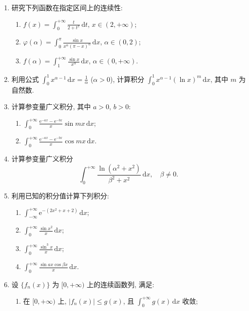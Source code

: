 \begin{exblock}[练习题 15.3]
\begin{enumerate}
  \item 研究下列函数在指定区间上的连续性:
  \begin{enumerate}
    \item $f(x)=\displaystyle\int_{0}^{+\infty}\frac{t}{2+t^{x}}\,\mathrm{d}t$, $x\in(2,+\infty)$;
    \item $\varphi(\alpha)=\displaystyle\int_{0}^{\pi}\frac{\sin x}{x^{\alpha}(\pi-x)^{\alpha}}\,\mathrm{d}x$, $\alpha\in(0,2)$;
    \item $f(\alpha)=\displaystyle\int_{1}^{+\infty}\frac{\sin x}{x^{\alpha}}\,\mathrm{d}x$, $\alpha\in(0,+\infty)$.
  \end{enumerate}
  \item 利用公式 $\displaystyle\int_{0}^{1}x^{\alpha-1}\,\mathrm{d}x=\frac{1}{\alpha}$ ($\alpha>0$), 计算积分 $\displaystyle\int_{0}^{1}x^{\alpha-1}(\ln x)^{m}\,\mathrm{d}x$, 其中 $m$ 为自然数.
  \item 计算参变量广义积分, 其中 $a>0$, $b>0$:
  \begin{enumerate}
    \item $\displaystyle\int_{0}^{+\infty}\frac{\mathrm{e}^{-ax}-\mathrm{e}^{-bx}}{x}\sin mx\,\mathrm{d}x$;
    \item $\displaystyle\int_{0}^{+\infty}\frac{\mathrm{e}^{-ax}-\mathrm{e}^{-bx}}{x}\cos mx\,\mathrm{d}x$.
  \end{enumerate}
  \item 计算参变量广义积分
  \[
    \int_{0}^{+\infty}\frac{\ln(\alpha^{2}+x^{2})}{\beta^{2}+x^{2}}\,\mathrm{d}x,\quad\beta\neq0.
\]
  \item 利用已知的积分值计算下列积分:
  \begin{enumerate}
    \item $\displaystyle\int_{-\infty}^{+\infty}\mathrm{e}^{-(2x^{2}+x+2)}\,\mathrm{d}x$;
    \item $\displaystyle\int_{0}^{+\infty}\frac{\sin x^{2}}{x}\,\mathrm{d}x$;
    \item $\displaystyle\int_{0}^{+\infty}\frac{\sin^{3}x}{x}\,\mathrm{d}x$;
    \item $\displaystyle\int_{0}^{+\infty}\frac{\sin ax\cos\beta x}{x}\,\mathrm{d}x$.
  \end{enumerate}
  \item 设 $\{f_{n}(x)\}$ 为 $[0,+\infty)$ 上的连续函数列, 满足:
  \begin{enumerate}
    \item 在 $[0,+\infty)$ 上, $|f_{n}(x)|\leqslant g(x)$, 且 $\displaystyle\int_{0}^{+\infty}g(x)\,\mathrm{d}x$ 收敛;

\end{enumerate}
\end{enumerate}
\end{exblock}

